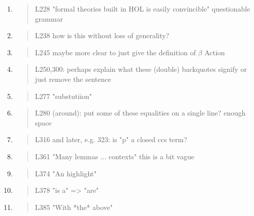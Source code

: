 \begin{enumerate}
\item \begin{quote}
    L228 "formal theories built in HOL is easily convincible" questionable grammar
  \end{quote}

\item \begin{quote}
    L238 how is this without loss of generality?
  \end{quote}

\item \begin{quote}
    L245 maybe more clear to just give the definition of $\beta$ Action 
  \end{quote}

\item \begin{quote}
    L250,300: perhaps explain what these (double) backquotes signify or just remove the sentence
  \end{quote}

\item \begin{quote}
    L277 "substutiion"
  \end{quote}

\item \begin{quote}
    L280 (around): put some of these equalities on a single line? enough space
  \end{quote}

\item \begin{quote}
    L316 and later, e.g. 323: is "p" a closed ccs term?
  \end{quote}

\item \begin{quote}
    L361 "Many lemmas ... contexts" this is a bit vague
  \end{quote}

\item \begin{quote}
    L374 "An highlight"
  \end{quote}

\item \begin{quote}
    L378 "is a" => "are"
  \end{quote}

\item \begin{quote}
    L385 "With *the* above"
  \end{quote}


\end{enumerate}
